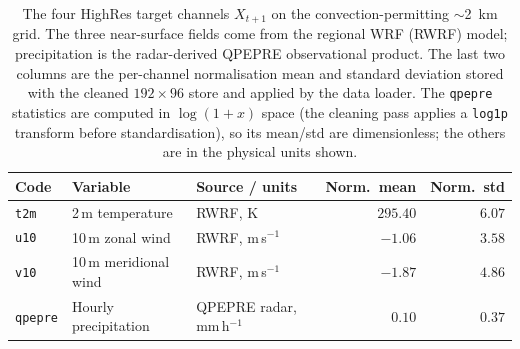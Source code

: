 
\begin{table}[htbp]
  \centering
  \caption[HighRes target variables]{The four HighRes target channels $X_{t+1}$
  on the convection-permitting $\sim$\SI{2}{\kilo\metre} grid. The three
  near-surface fields come from the regional WRF (RWRF) model; precipitation is
  the radar-derived QPEPRE observational product. The last two columns are the
  per-channel normalisation mean and standard deviation stored with the cleaned
  $192\times96$ store and applied by the data loader. The \texttt{qpepre}
  statistics are computed in $\log(1+x)$ space (the cleaning pass applies a
  \texttt{log1p} transform before standardisation), so its mean/std are
  dimensionless; the others are in the physical units shown.}
  \label{tab:highres-vars}
  \small
  \begin{tabular}{lllrr}
    \toprule
    Code & Variable & Source / units & Norm.\ mean & Norm.\ std \\
    \midrule
    \texttt{t2m}    & 2\,m temperature      & RWRF, K              & $295.40$ & $6.07$ \\
    \texttt{u10}    & 10\,m zonal wind      & RWRF, m\,s$^{-1}$    & $-1.06$  & $3.58$ \\
    \texttt{v10}    & 10\,m meridional wind & RWRF, m\,s$^{-1}$    & $-1.87$  & $4.86$ \\
    \texttt{qpepre} & Hourly precipitation  & QPEPRE radar, mm\,h$^{-1}$ & $0.10$ & $0.37$ \\
    \bottomrule
  \end{tabular}
\end{table}

